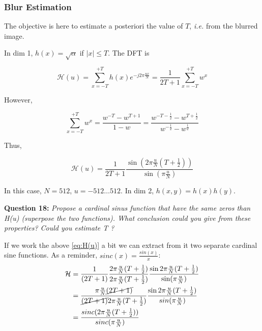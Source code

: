 

\subsubsection{Blur Estimation}
The objective is here to estimate a posteriori the value of $T$, \textit{i.e.} from the blurred image.

\noindent In dim 1, $h(x) = \sqrt{\alpha}$ if $|x| \leq T$. The DFT is

\begin{equation}
\label{eq:DFT}
\mathcal{H}(u) = \sum_{x=-T}^{+T} h(x)e^{-j 2\pi \frac{ux}{N}} = \frac{1}{2T+1} \sum_{x=-T}^{+T} w^x
\end{equation}

However,

\[
\sum_{x=-T}^{+T} w^x = \frac{w^{-T} - w^{T+1}}{1 - w} = \frac{w^{-T-\frac{1}{2}} - w^{T+\frac{1}{2}}}{w^{-\frac{1}{2}} - w^{\frac{1}{2}}}
\]

Thus,

\begin{equation}
\label{eq:H(u)}
\mathcal{H}(u) = \frac{1}{2T+1} \frac{\sin\left(2\pi \frac{u}{N} (T + \frac{1}{2})\right)}{\sin\left(\pi \frac{u}{N}\right)}
\end{equation}

In this case, $N = 512$, $u = -512 \dots 512$. In dim 2, $h(x,y) = h(x)h(y)$.

\textbf{Question 18:}
\textit{Propose a cardinal sinus function that have the same zeros than H(u) (superpose the two functions). What conclusion could you give from these properties? Could you estimate T ?}

If we work the above \autoref{eq:H(u)} a bit we can extract from it two separate cardinal sine functions. As a reminder, $sinc(x) = \frac{sin(x)}{x}$:
\begin{equation}
\begin{split}    
    \mathcal{H} &= \frac{1}{(2T +1)} \frac{2 \pi \frac{u}{N}(T + \frac{1}{2})}{2 \pi \frac{u}{N}(T + \frac{1}{2})} \frac{\sin 2 \pi \frac{u}{N}(T + \frac{1}{2})}{\sin ( \pi \frac{u}{N})}
    \\
    &= \frac{\pi\frac{u}{N} \cancel{(2 T +1)}}{\cancel{(2T+1)}  2\pi \frac{u}{N}(T+\frac{1}{2})} 
    \frac{\sin 2 \pi \frac{u}{N}(T + \frac{1}{2})}{sin( \pi \frac{u}{N})}
    \\
    &= \frac{sinc (2 \pi \frac{u}{N}(T + \frac{1}{2}))}{sinc( \pi \frac{u}{N})}
\end{split}
\end{equation}

